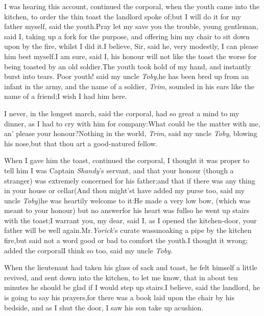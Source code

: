 \documentclass{article}
\begin{document}
I was hearing this account, continued the corporal, when the
youth came into the kitchen, to order the thin toast the landlord
spoke of;\tsh but I will do it for my father myself, said
the youth.\break\tsh Pray let my save you the trouble,\pb
young gentleman, said I, taking up a fork for the purpose, and
offering him my chair to sit down upon by the fire, whilst I did
it.\tsh I believe, Sir, said he, very modestly, I can please him
best myself.\tsh I am sure, said I, his honour will not like the
toast the worse for being toasted by an old soldier.\tsh The
youth took hold of my hand, and instantly burst into tears.\tsh
Poor youth! said my uncle \textit{Toby},\tsk he has been bred up
from an infant in the army, and the name of a soldier,
\textit{Trim}, sounded in his ears like the name of a
friend;\tsk I wish I had him here.

\tsh I never, in the longest march, said the corporal,
had so great a mind to my dinner, as I had to cry with him for
company:\tsk What could be the matter with me, an’ please
your honour?\pb Nothing in the world, \textit{Trim}, said my uncle
\textit{Toby}, blowing his nose,\tsk but that thou art a
good-natured fellow.

When I gave him the toast, continued the corporal, I thought it
was proper to tell him I was Captain \textit{Shandy}’s servant,
and that your honour (though a stranger) was extremely concerned
for his father;\tsk and that if there was any thing in your house
or cellar\tsh (And thou might’st have added my purse
too, said my uncle \textit{Toby})\tsh he was heartily
welcome to it:\tsh He made a very low bow, (which was meant
to your honour) but no answer\tsk for his heart was
full\tsk\break so he went up stairs with the toast;\tsk I warrant
you, my dear, said I, as I opened the kitchen-door, your father
will be well again.\tsh Mr.\@ \textit{Yorick}’s
curate was\pb smoaking a pipe by the kitchen fire,\tsk but said not a
word good or bad to comfort the youth.\tsh I thought it
wrong; added the corporal\tsh I think so too, said my
uncle \textit{Toby.}

When the lieutenant had taken his glass of sack and toast, he
felt himself a little revived, and sent down into the kitchen, to
let me know, that in about\break
ten minutes he should be glad if I would
step up stairs.\tsh I believe, said the landlord, he is
going to say his prayers,\tsh for there was a book laid
upon the chair by his bedside, and as I shut the door, I saw his
son take up a\break cushion.\tsh
\end{document}
